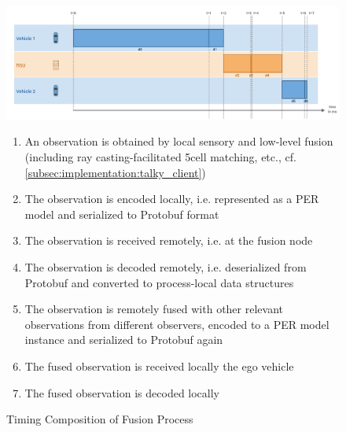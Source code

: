 \begin{figure}
	\centering
	\includegraphics[width=1\linewidth]{98_images/communication_timeline}
	\caption{Timing Composition of Fusion Process}
	\label{fig:communication_timeline}
	\medskip
	\small
	\begin{enumerate}[t = 1:\ ]
		\item An observation is obtained by local sensory and low-level fusion (including ray casting-facilitated 5cell matching, etc., cf. \cref{subsec:implementation:talky_client}) \\
		\item The observation is encoded locally, i.e. represented as a PER model and serialized to Protobuf format
		\item The observation is received remotely, i.e. at the fusion node
		\item The observation is decoded remotely, i.e. deserialized from Protobuf and converted to process-local data structures
		\item The observation is remotely fused with other relevant observations from different observers, encoded to a PER model instance and serialized to Protobuf again
		\item The fused observation is received locally the ego vehicle
		\item The fused observation is decoded locally
	\end{enumerate}
\end{figure}
